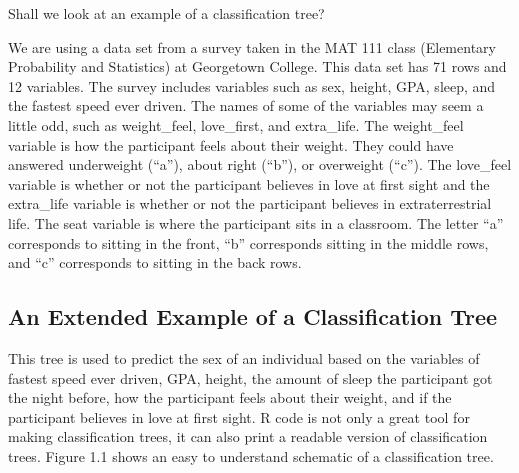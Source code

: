 \documentclass[12pt,twoside]{reedthesis}
\begin{document}
  Shall we look at an example of a classification tree?
  
  We are using a data set from a survey taken in the MAT 111 class
  (Elementary Probability and Statistics) at Georgetown College. This data
  set has 71 rows and 12 variables. The survey includes variables such as
  sex, height, GPA, sleep, and the fastest speed ever driven. The names of
  some of the variables may seem a little odd, such as weight\_feel,
  love\_first, and extra\_life. The weight\_feel variable is how the
  participant feels about their weight. They could have answered
  underweight (``a''), about right (``b''), or overweight (``c''). The
  love\_feel variable is whether or not the participant believes in love
  at first sight and the extra\_life variable is whether or not the
  participant believes in extraterrestrial life. The seat variable is
  where the participant sits in a classroom. The letter ``a'' corresponds
  to sitting in the front, ``b'' corresponds sitting in the middle rows,
  and ``c'' corresponds to sitting in the back rows.
  
  \subsection{An Extended Example of a Classification
  Tree}\label{an-extended-example-of-a-classification-tree}
  
  This tree is used to predict the sex of an individual based on the
  variables of fastest speed ever driven, GPA, height, the amount of sleep
  the participant got the night before, how the participant feels about
  their weight, and if the participant believes in love at first sight. R
  code is not only a great tool for making classification trees, it can
  also print a readable version of classification trees. Figure 1.1 shows
  an easy to understand schematic of a classification tree.
  
\end{document}
